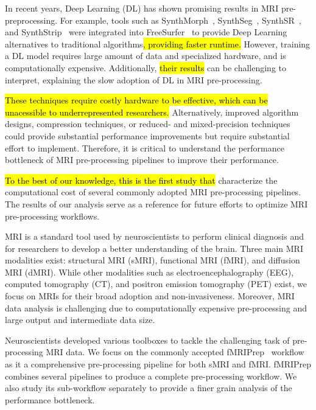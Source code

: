 \documentclass[conference]{IEEEtran}
\newcommand{\HL}[1]{\hl{#1}}
\begin{document}
In recent years, Deep Learning (DL) has shown promising results in MRI pre-preprocessing. For example, tools such as SynthMorph~\cite{Hoffmann2022-hu}, SynthSeg~\cite{Billot2023-vp}, SynthSR~\cite{Iglesias2023-bp}, and SynthStrip~\cite{Hoopes2022-ms} were integrated into FreeSurfer~\cite{Fischl2012-cx} to provide Deep Learning alternatives to traditional algorithms\HL{, providing faster runtime.}
However, training a DL model requires large amount of data and specialized hardware, and is computationally expensive. Additionally, \HL{their results} can be challenging to interpret, explaining the slow adoption of DL in MRI pre-processing.

\HL{These techniques require costly hardware to be effective, which can be unacessible to underrepresented researchers.} Alternatively, improved algorithm designs, compression techniques, or reduced- and mixed-precision techniques could provide substantial performance improvements but require substantial effort to implement. Therefore, it is critical to understand the performance bottleneck of MRI pre-processing pipelines to improve their performance.

\HL{To the best of our knowledge, this is the first study that} characterize the computational cost of several commonly adopted MRI pre-processing pipelines. The results of our analysis serve as a reference for future efforts to optimize MRI pre-processing workflows.

MRI is a standard tool used by neuroscientists to perform clinical diagnosis and for researchers to develop a better understanding of the brain. Three main MRI modalities exist: structural MRI (sMRI), functional MRI (fMRI), and diffusion MRI (dMRI). While other modalities such as electroencephalography (EEG), computed tomography (CT), and positron emission tomography (PET) exist, we focus on MRIs for their broad adoption and non-invasiveness. Moreover, MRI data analysis is challenging due to computationally expensive pre-processing and large output and intermediate data size.

Neuroscientists developed various toolboxes to tackle the challenging task of pre-processing MRI data. We focus on the commonly accepted fMRIPrep~\cite{Esteban2019-bl} workflow as it a comprehensive pre-processing pipeline for both sMRI and fMRI. fMRIPrep combines several pipelines to produce a complete pre-processing workflow. We also study its sub-workflow separately to provide a finer grain analysis of the performance bottleneck.
\end{document}
